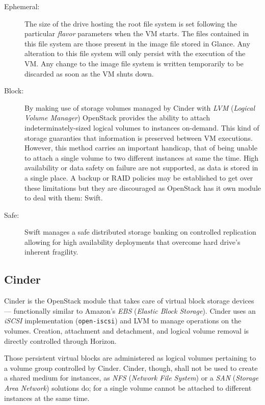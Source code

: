 \begin{description}
 \item[Ephemeral:] The size of the drive hosting the root file system is set following the particular \emph{flavor} parameters when the VM starts. The files contained in this file system are those present in the image file stored in Glance. Any alteration to this file system will only persist with the execution of the VM. Any change to the image file system is written temporarily to be discarded as soon as the VM shuts down.
 \item[Block:] By making use of storage volumes managed by Cinder with \emph{LVM} (\emph{Logical Volume Manager}) OpenStack provides the ability to attach indeterminately-sized logical volumes to instances on-demand. This kind of storage guaranties that information is preserved between VM executions. However, this method carries an important handicap, that of being unable to attach a single volume to two different instances at same the time. High availability or data safety on failure are not supported, as data is stored in a single place. A backup or RAID policies may be established to get over these limitations but they are discouraged as OpenStack has it own module to deal with them: Swift.
 \item[Safe:] Swift manages a safe distributed storage banking on controlled replication allowing for high availability deployments that overcome hard drive's inherent fragility.
\end{description}

\subsection{Cinder}\label{subsec:cinder}
\noindent Cinder is the OpenStack module that takes care of virtual block storage devices --- functionally similar to Amazon's \emph{EBS} (\emph{Elastic Block Storage}). Cinder uses an \emph{iSCSI} implementation (\texttt{open-iscsi}) and LVM to manage operations on the volumes. Creation, attachment and detachment, and logical volume removal is directly controlled through Horizon.

Those persistent virtual blocks are administered as logical volumes pertaining to a volume group controlled by Cinder. Cinder, though, shall not be used to create a shared medium for instances, as \emph{NFS} (\emph{Network File System}) or a \emph{SAN} (\emph{Storage Area Network}) solutions do; for a single volume cannot be attached to different instances at the same time.

